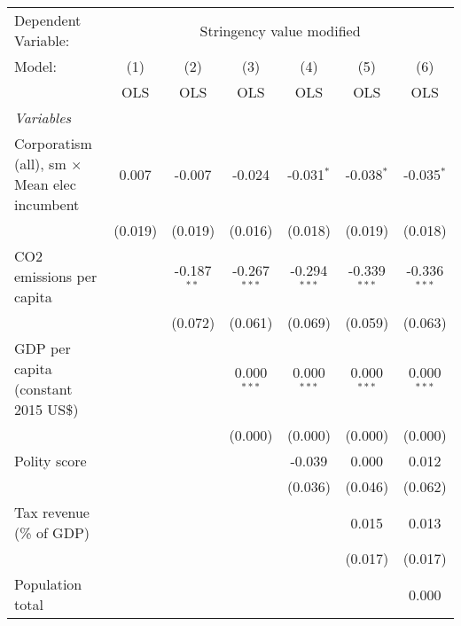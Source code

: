
\begingroup
\centering
\begin{tabular}{lcccccc}
   \toprule
   Dependent Variable: & \multicolumn{6}{c}{Stringency value modified}\\
   Model:                                              & (1)     & (2)           & (3)            & (4)            & (5)            & (6)\\  
                                                       &  OLS    & OLS           & OLS            & OLS            & OLS            & OLS\\  
   \midrule
   \emph{Variables}\\
   Corporatism (all), sm $\times$ Mean elec incumbent  & 0.007   & -0.007        & -0.024         & -0.031$^{*}$   & -0.038$^{*}$   & -0.035$^{*}$\\   
                                                       & (0.019) & (0.019)       & (0.016)        & (0.018)        & (0.019)        & (0.018)\\   
   CO2 emissions per capita                            &         & -0.187$^{**}$ & -0.267$^{***}$ & -0.294$^{***}$ & -0.339$^{***}$ & -0.336$^{***}$\\   
                                                       &         & (0.072)       & (0.061)        & (0.069)        & (0.059)        & (0.063)\\   
   GDP per capita (constant 2015 US\$)                 &         &               & 0.000$^{***}$  & 0.000$^{***}$  & 0.000$^{***}$  & 0.000$^{***}$\\   
                                                       &         &               & (0.000)        & (0.000)        & (0.000)        & (0.000)\\   
   Polity score                                        &         &               &                & -0.039         & 0.000          & 0.012\\   
                                                       &         &               &                & (0.036)        & (0.046)        & (0.062)\\   
   Tax revenue (\% of GDP)                             &         &               &                &                & 0.015          & 0.013\\   
                                                       &         &               &                &                & (0.017)        & (0.017)\\   
   Population total                                    &         &               &                &                &                & 0.000\\   

\end{tabular}
